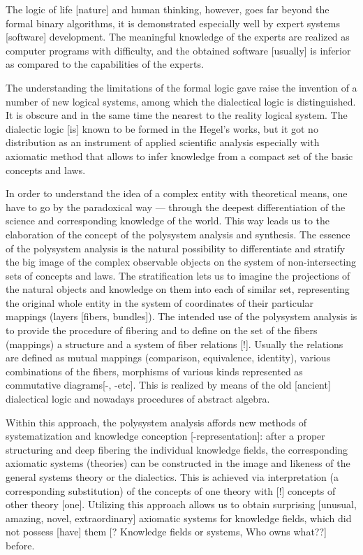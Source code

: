\documentclass[12pt,leqno]{book}
\numberwithin{equation}{chapter}
\begin{document}
The logic of life [nature] and human thinking, however, goes far beyond the formal binary algorithms, it is demonstrated especially well by expert systems [software] development. The meaningful knowledge of the experts are realized as computer programs with difficulty, and the obtained software [usually] is inferior as compared to the capabilities of the experts.

The understanding the limitations of the formal logic gave raise the invention of a number of new logical systems, among which the dialectical logic is distinguished. It is obscure and in the same time the nearest to the reality logical system. The dialectic logic [is] known to be formed in the Hegel's works, but it got no distribution as an instrument of applied scientific analysis especially with axiomatic method that allows to infer knowledge from a compact set of the basic concepts and laws.

In order to understand the idea of a complex entity with theoretical means, one have to go by the paradoxical way --- through the deepest differentiation of the science and corresponding knowledge of the world. This way leads us to the elaboration of the concept of the polysystem analysis and synthesis. The essence of the polysystem analysis is the natural possibility to differentiate and stratify the big image of the complex observable objects on the system of non-intersecting sets of concepts and laws. The stratification lets us to imagine the projections of the natural objects and knowledge on them into each of similar set, representing the original whole entity in the system of coordinates of their particular mappings (layers [fibers, bundles]). The intended use of the polysystem analysis is to provide the procedure of fibering and to define on the set of the fibers (mappings) a structure and a system of fiber relations [!]. Usually the relations are defined as mutual mappings (comparison, equivalence, identity), various combinations of the fibers, morphisms of various kinds represented as commutative diagrams[-, -etc]. This is realized by means of the old [ancient] dialectical logic and nowadays procedures of abstract algebra.

Within this approach, the polysystem analysis affords new methods of systematization and knowledge conception [-representation]: after a proper structuring and deep fibering the individual knowledge fields, the corresponding axiomatic systems (theories) can be constructed in the image and likeness of the general systems theory or the dialectics. This is achieved via interpretation (a corresponding substitution) of the concepts of one theory with [!] concepts of other theory [one]. Utilizing this approach allows us to obtain surprising [unusual, amazing, novel, extraordinary] axiomatic systems for knowledge fields, which did not possess [have] them [? Knowledge fields or systems, Who owns what??] before.
\end{document}
